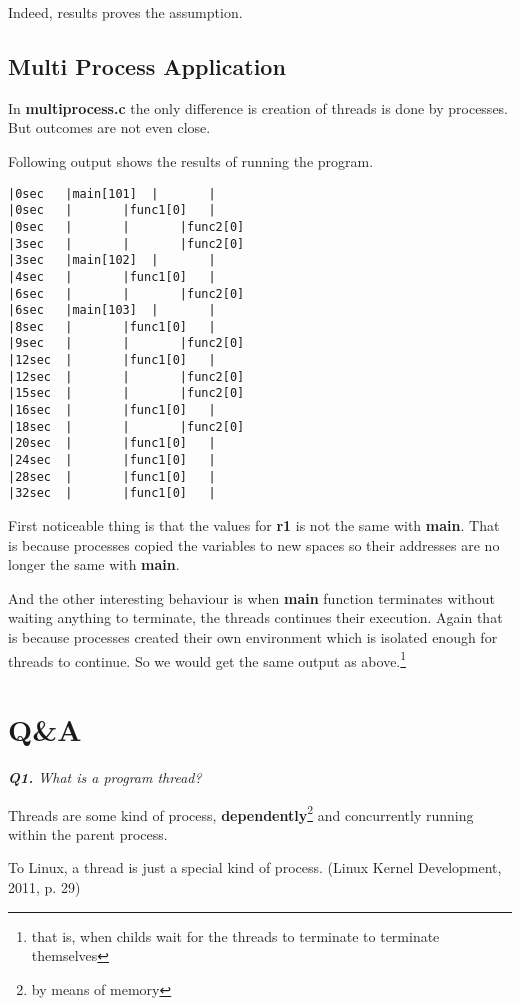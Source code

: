 \documentclass[11pt]{article}
\begin{document}
Indeed, results proves the assumption.

\subsection*{Multi Process Application}
In \textbf{multiprocess.c} the only difference is creation of threads is done by processes. But outcomes are not even close.

Following output shows the results of running the program.

\begin{minipage}{1\textwidth}
\begin{lstlisting}[title=Timeline (multiprocess.c), frame=tlrb]
|0sec	|main[101]	|		|
|0sec	|		|func1[0]	|
|0sec	|		|		|func2[0]
|3sec	|		|		|func2[0]
|3sec	|main[102]	|		|
|4sec	|		|func1[0]	|
|6sec	|		|		|func2[0]
|6sec	|main[103]	|		|
|8sec	|		|func1[0]	|
|9sec	|		|		|func2[0]
|12sec	|		|func1[0]	|
|12sec	|		|		|func2[0]
|15sec	|		|		|func2[0]
|16sec	|		|func1[0]	|
|18sec	|		|		|func2[0]
|20sec	|		|func1[0]	|
|24sec	|		|func1[0]	|
|28sec	|		|func1[0]	|
|32sec	|		|func1[0]	|
\end{lstlisting}
\end{minipage}

First noticeable thing is that the values for \textbf{r1} is not the same with \textbf{main}. That is because processes copied the variables to new spaces so their addresses are no longer the same with \textbf{main}.

And the other interesting behaviour is when \textbf{main} function terminates without waiting anything to terminate, the threads continues their execution. Again that is because processes created their own environment which is isolated enough for threads to continue. So we would get the same output as above.\footnote{that is, when childs wait for the threads to terminate to terminate themselves }

\section*{Q\&A}

\vspace{3mm}
\textit{\textbf{Q1.} What is a program thread?}
\vspace{3mm}

Threads are some kind of process, \textbf{dependently}\footnote{by means of memory} and concurrently running within the parent process.

\begin{displayquote}
To Linux, a thread is just a special kind of process. (Linux Kernel Development, 2011, p. 29)
\end{displayquote}
\end{document}
